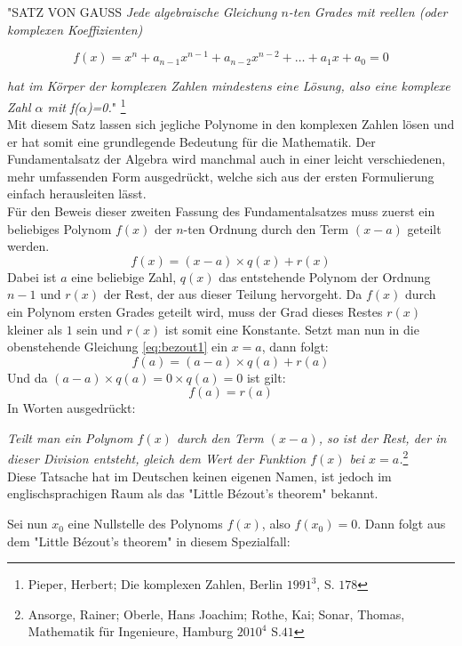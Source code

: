 \documentclass[a4paper,12pt]{article} %
\begin{document}
\noindent "\uppercase{Satz von Gauss} \emph{Jede algebraische Gleichung $n$-ten Grades mit reellen (oder komplexen Koeffizienten)}

\begin{equation}\label{eq:funda}
	\boxed{
		f(x)=x^n + a_{n-1}x^{n-1} + a_{n-2}x^{n-2} + \dots + a_1x + a_0 = 0
	}
\end{equation} 

\noindent \emph{hat im Körper der komplexen Zahlen mindestens eine Lösung, also eine komplexe Zahl $\alpha$ mit f($\alpha$)=0.}"{} 
\footnote{Pieper, Herbert; Die komplexen Zahlen, Berlin $1991^3$, S. $178$}\\

Mit diesem Satz lassen sich jegliche Polynome in den komplexen Zahlen lösen und er hat somit eine grundlegende Bedeutung für die Mathematik.
Der Fundamentalsatz der Algebra wird manchmal auch in einer leicht verschiedenen, mehr umfassenden Form ausgedrückt, welche sich aus der ersten Formulierung einfach herausleiten lässt.\\

Für den Beweis dieser zweiten Fassung des Fundamentalsatzes muss zuerst ein beliebiges Polynom $f(x)$ der $n$-ten Ordnung durch den Term $(x-a)$ geteilt werden.
\begin{equation}\label{eq:bezout1}
f(x) = (x - a) \times q(x) + r(x)
\end{equation} 
Dabei ist $a$ eine beliebige Zahl, $q(x)$ das entstehende Polynom der Ordnung $n-1$ und $r(x)$ der Rest, der aus dieser Teilung hervorgeht.
Da $f(x)$ durch ein Polynom ersten Grades geteilt wird, muss der Grad dieses Restes $r(x)$ kleiner als $1$ sein und $r(x)$ ist somit eine Konstante.
Setzt man nun in die obenstehende Gleichung \eqref{eq:bezout1} ein $x=a$, dann folgt:
\[ f(a) = (a-a) \times q(a) + r(a) \]
Und da $(a - a) \times q(a) = 0 \times q(a) = 0 $ ist gilt:
\[ f(a) = r(a) \]
In Worten ausgedrückt:

\noindent \emph{Teilt man ein Polynom $f(x)$ durch den Term $(x-a)$, so ist der Rest, der in dieser Division entsteht, gleich dem Wert der Funktion $f(x)$ bei $x=a$.}\footnote{Ansorge, Rainer; Oberle, Hans Joachim; Rothe, Kai; Sonar, Thomas, Mathematik für Ingenieure, Hamburg $2010^4$ S.$41$}\\

Diese Tatsache hat im Deutschen keinen eigenen Namen, ist jedoch im englischsprachigen Raum als das "Little Bézout's theorem" bekannt. %

Sei nun $x_0$ eine Nullstelle des Polynoms $f(x)$, also $f(x_0)=0$. Dann folgt aus dem "Little Bézout's theorem" {}in diesem Spezialfall:
\end{document}
